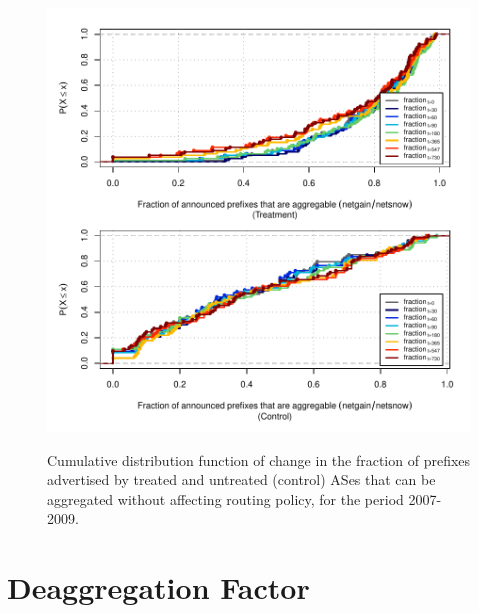 \clearpage
\vspace*{16pt}
\begin{figure}[H]
\begin{centering}
\begin{singlespace}
\captionsetup{list=no}
    \includegraphics[width=6in]{figures/behavior-frac_deagg-2007_2009-corr.pdf}
    \vspace{-2em}\\
    \caption{Cumulative distribution function of change in the fraction of
    prefixes advertised by treated and untreated (control) ASes that can be
    aggregated without affecting routing policy, for the period 2007-2009.}
\end{singlespace}
\end{centering}
\end{figure}


\clearpage
\section{Deaggregation Factor}

